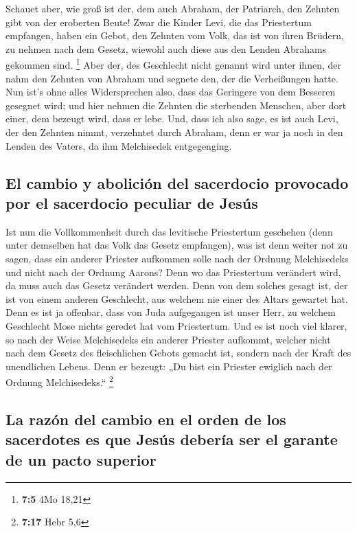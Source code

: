  Schauet aber, wie groß ist der, dem auch Abraham, der
Patriarch, den Zehnten gibt von der eroberten Beute!  Zwar
die Kinder Levi, die das Priestertum empfangen, haben ein Gebot, den
Zehnten vom Volk, das ist von ihren Brüdern, zu nehmen nach dem Gesetz,
wiewohl auch diese aus den Lenden Abrahams gekommen sind. \footnote{\textbf{7:5}
  4Mo 18,21}  Aber der, des Geschlecht nicht genannt wird
unter ihnen, der nahm den Zehnten von Abraham und segnete den, der die
Verheißungen hatte.  Nun ist's ohne alles Widersprechen
also, dass das Geringere von dem Besseren gesegnet wird; 
und hier nehmen die Zehnten die sterbenden Menschen, aber dort einer,
dem bezeugt wird, dass er lebe.  Und, dass ich also sage,
es ist auch Levi, der den Zehnten nimmt, verzehntet durch Abraham,
 denn er war ja noch in den Lenden des Vaters, da ihm
Melchisedek entgegenging.

\hypertarget{el-cambio-y-aboliciuxf3n-del-sacerdocio-provocado-por-el-sacerdocio-peculiar-de-jesuxfas}{%
\subsection{El cambio y abolición del sacerdocio provocado por el
sacerdocio peculiar de
Jesús}\label{el-cambio-y-aboliciuxf3n-del-sacerdocio-provocado-por-el-sacerdocio-peculiar-de-jesuxfas}}

 Ist nun die Vollkommenheit durch das levitische
Priestertum geschehen (denn unter demselben hat das Volk das Gesetz
empfangen), was ist denn weiter not zu sagen, dass ein anderer Priester
aufkommen solle nach der Ordnung Melchisedeks und nicht nach der Ordnung
Aarons?  Denn wo das Priestertum verändert wird, da muss
auch das Gesetz verändert werden.  Denn von dem solches
gesagt ist, der ist von einem anderen Geschlecht, aus welchem nie einer
des Altars gewartet hat.  Denn es ist ja offenbar, dass
von Juda aufgegangen ist unser Herr, zu welchem Geschlecht Mose nichts
geredet hat vom Priestertum.  Und es ist noch viel
klarer, so nach der Weise Melchisedeks ein anderer Priester aufkommt,
 welcher nicht nach dem Gesetz des fleischlichen Gebots
gemacht ist, sondern nach der Kraft des unendlichen Lebens.
 Denn er bezeugt: „Du bist ein Priester ewiglich nach der
Ordnung Melchisedeks.`` \footnote{\textbf{7:17} Hebr 5,6}

\hypertarget{la-razuxf3n-del-cambio-en-el-orden-de-los-sacerdotes-es-que-jesuxfas-deberuxeda-ser-el-garante-de-un-pacto-superior}{%
\subsection{La razón del cambio en el orden de los sacerdotes es que
Jesús debería ser el garante de un pacto
superior}\label{la-razuxf3n-del-cambio-en-el-orden-de-los-sacerdotes-es-que-jesuxfas-deberuxeda-ser-el-garante-de-un-pacto-superior}}

